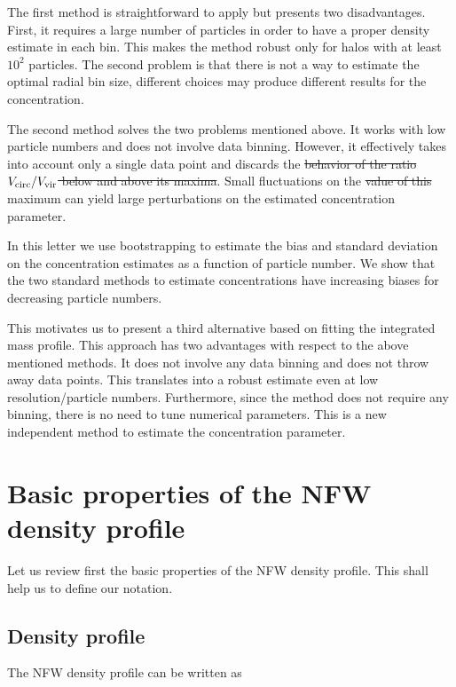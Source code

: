 \documentclass{emulateapj}
\providecommand{\DIFadd}[1]{{\protect\color{blue}\uwave{#1}}} %
\providecommand{\DIFdel}[1]{{\protect\color{red}\sout{#1}}}                      %
\providecommand{\DIFaddbegin}{} %
\providecommand{\DIFaddend}{} %
\providecommand{\DIFdelbegin}{} %
\providecommand{\DIFdelend}{} %
\begin{document}
The first method is straightforward to apply but presents two
disadvantages.  First, it requires a large number of particles in
order to have a proper density estimate in each bin.  This makes the
method robust only for halos with at least $10^2$ particles.  The
second problem is that there is not a way to estimate the optimal
radial bin size, different choices may produce different results for
the concentration.

The second method solves the two problems mentioned above.  
It works with low particle numbers and does not involve data binning.  
However, it effectively takes into account only a single data point
and discards the \DIFdelbegin \DIFdel{behavior of the ratio $V_{\rm circ}/V_{\rm vir}$ below
and above its maxima}\DIFdelend \DIFaddbegin \DIFadd{rest of the data}\DIFaddend .
Small fluctuations on the \DIFdelbegin \DIFdel{value of this }\DIFdelend maximum can yield large perturbations on the
estimated concentration parameter.

In this letter we use bootstrapping to estimate the bias and standard
deviation on the concentration estimates as a function of particle
number. 
We show that the two standard methods to estimate concentrations have
increasing biases for decreasing particle numbers.  

This motivates us to present a third alternative based on fitting the
integrated mass profile.  
This approach has two advantages with respect to the above mentioned methods.  
It does not involve any data binning and does not throw away data points.  
This translates into a robust estimate even at low resolution/particle
numbers.   
Furthermore, since the method does not require any binning, there is no need to
tune numerical parameters.  
This is a new independent method to estimate the
concentration parameter.   


\section{Basic properties of the NFW density profile}
\label{sec:basics}

Let us review first the basic properties of the NFW density profile.
This shall help us to define our notation.

\subsection{Density profile}

The NFW density profile can be written as
\end{document}
